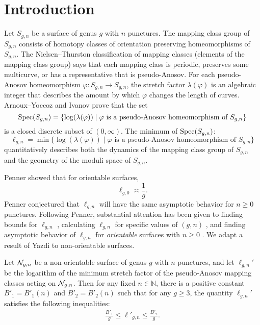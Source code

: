 \section{Introduction}
\label{sec:introduction}


Let $S_{g,n}$ be a surface of genus $g$ with $n$ punctures.  The mapping class group of $S_{g,n}$ consists of homotopy classes of orientation preserving homeomorphisms of $S_{g,n}$.  The Nielsen--Thurston classification of mapping classes (elements of the mapping class group) says that each mapping class is periodic, preserves some multicurve, or has a representative that is pseudo-Anosov.  For each pseudo-Anosov homeomorphism $\varphi:S_{g,n}\rightarrow S_{g,n}$, the stretch factor $\lambda(\varphi)$ is an algebraic integer that describes the amount by which $\varphi$ changes the length of curves.  Arnoux--Yoccoz \cite{AY} and Ivanov \cite{ivanov} prove that the set
$$\operatorname{Spec}(S_{g,n})=\{\log(\lambda(\varphi)) \mid \varphi \text{ is a pseudo-Anosov homeomorphism of }S_{g,n}\}$$ is a closed discrete subset of $(0,\infty)$. The minimum of $\operatorname{Spec}(S_{g,n})$:
$$\ell_{g,n}=\min\{\log(\lambda(\varphi)) \mid \varphi \text{ is a pseudo-Anosov homeomorphism of }S_{g,n}\}$$ quantitatively describes both the dynamics of the mapping class group of $S_{g,n}$ and the geometry of the moduli space of $S_{g,n}$.

Penner \cite{penner1991bounds} showed that for orientable surfaces, $$\ell_{g,0}\asymp \frac{1}{g}.$$ 
  Penner conjectured that $\ell_{g,n}$ will have the same asymptotic behavior for  $n\geq0$ punctures.  Following Penner, substantial attention has been given to finding bounds for $\ell_{g,n}$ \cite{AD,bauer,hironaka,HK,HK20,KT,Loving,minakawa}, calculating $\ell_{g,n}$ for specific values of $(g,n)$ \cite{CH,HS,LT,SKL}, and finding asymptotic behavior of $\ell_{g,n}$ for {\it orientable} surfaces with $n\geq 0$ \cite{KT,tsai2009asymptotic,valdivia,yazdi2018pseudo}.  We adapt a result of Yazdi \cite{yazdi2018pseudo} to non-orientable surfaces. 

\begin{thm}\label{thm:stretch1}
  Let $\mathcal{N}_{g,n}$ be a non-orientable surface of genus $g$ with $n$ punctures, and let $\ell_{g,n}'$ be the logarithm of
  the minimum stretch factor of the pseudo-Anosov mapping classes acting on $\mathcal{N}_{g,n}$.
  Then for any fixed $n \in \mathbb{N}$, there is a positive constant $B'_1 = B'_1(n)$ and $B'_2 = B'_2(n)$ such
  that for any $g \geq 3$,
  the quantity $\ell_{g,n}'$ satisfies the following inequalities:
  \begin{align*}
    \frac{B'_1}{g} \leq \ell'_{g,n} \leq \frac{B'_2}{g}.
  \end{align*}
\end{thm}



